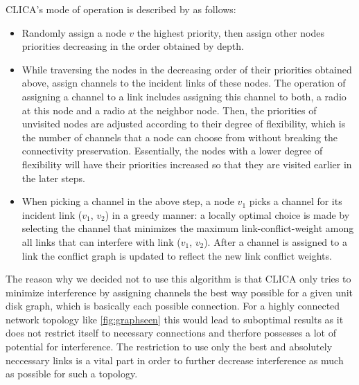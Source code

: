     CLICA's mode of operation is described by \cite{overview_caa} as follows:
    \begin{itemize}
      \item Randomly assign a node \(v\) the highest priority, then assign other
	nodes priorities decreasing in the order obtained by depth.
	
      \item While traversing the nodes in the decreasing order of their
	priorities obtained above, assign channels to the incident links
	of these nodes. The operation of assigning a channel to a link
	includes assigning this channel to both, a radio at this node and
	a radio at the neighbor node. Then, the priorities of unvisited
	nodes are adjusted according to their degree of flexibility, which
	is the number of channels that a node can choose from without
	breaking the connectivity preservation. Essentially, the nodes
	with a lower degree of flexibility will have their priorities
	increased so that they are visited earlier in the later steps.
	
      \item When picking a channel in the above step, a node \(v_1\) picks
	a channel for its incident link (\(v_1\), \(v_2\)) in a greedy manner: a
	locally optimal choice is made by selecting the channel that
	minimizes the maximum link-conflict-weight among all links
	that can interfere with link (\(v_1\), \(v_2\)). After a channel is assigned
	to a link the conflict graph is updated to reflect the new link conflict weights.
    \end{itemize}
  
    The reason why we decided not to use this algorithm is that \ac{CLICA} only tries to minimize interference by assigning channels the best way possible for a given
    unit disk graph, which is basically each possible connection. For a highly connected network topology like \ref{fig:graphseen} this would lead to suboptimal results
    as it does not restrict itself to necessary connections and therfore possesses a lot of potential for interference.
    The restriction to use only the best and absolutely neccessary links is a vital part in order to 
    further decrease interference as much as possible for such a topology.
    
